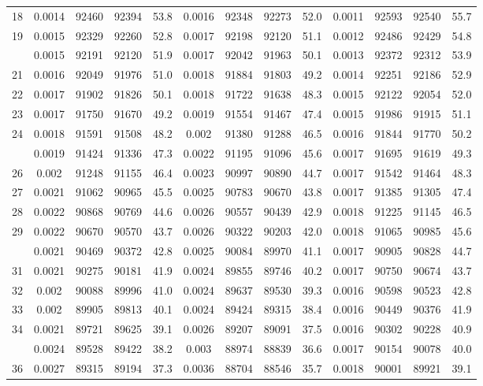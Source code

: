 \documentclass[
  14pt,
]{article}
\begin{document}
\begin{longtable}[t]{lcccccccccccc}
18 & 0.0014 & 92460 & 92394 & 53.8 & 0.0016 & 92348 & 92273 & 52.0 & 0.0011 & 92593 & 92540 & 55.7\\
19 & 0.0015 & 92329 & 92260 & 52.8 & 0.0017 & 92198 & 92120 & 51.1 & 0.0012 & 92486 & 92429 & 54.8\\
\addlinespace
20 & 0.0015 & 92191 & 92120 & 51.9 & 0.0017 & 92042 & 91963 & 50.1 & 0.0013 & 92372 & 92312 & 53.9\\
21 & 0.0016 & 92049 & 91976 & 51.0 & 0.0018 & 91884 & 91803 & 49.2 & 0.0014 & 92251 & 92186 & 52.9\\
22 & 0.0017 & 91902 & 91826 & 50.1 & 0.0018 & 91722 & 91638 & 48.3 & 0.0015 & 92122 & 92054 & 52.0\\
23 & 0.0017 & 91750 & 91670 & 49.2 & 0.0019 & 91554 & 91467 & 47.4 & 0.0015 & 91986 & 91915 & 51.1\\
24 & 0.0018 & 91591 & 91508 & 48.2 & 0.002 & 91380 & 91288 & 46.5 & 0.0016 & 91844 & 91770 & 50.2\\
\addlinespace
25 & 0.0019 & 91424 & 91336 & 47.3 & 0.0022 & 91195 & 91096 & 45.6 & 0.0017 & 91695 & 91619 & 49.3\\
26 & 0.002 & 91248 & 91155 & 46.4 & 0.0023 & 90997 & 90890 & 44.7 & 0.0017 & 91542 & 91464 & 48.3\\
27 & 0.0021 & 91062 & 90965 & 45.5 & 0.0025 & 90783 & 90670 & 43.8 & 0.0017 & 91385 & 91305 & 47.4\\
28 & 0.0022 & 90868 & 90769 & 44.6 & 0.0026 & 90557 & 90439 & 42.9 & 0.0018 & 91225 & 91145 & 46.5\\
29 & 0.0022 & 90670 & 90570 & 43.7 & 0.0026 & 90322 & 90203 & 42.0 & 0.0018 & 91065 & 90985 & 45.6\\
\addlinespace
30 & 0.0021 & 90469 & 90372 & 42.8 & 0.0025 & 90084 & 89970 & 41.1 & 0.0017 & 90905 & 90828 & 44.7\\
31 & 0.0021 & 90275 & 90181 & 41.9 & 0.0024 & 89855 & 89746 & 40.2 & 0.0017 & 90750 & 90674 & 43.7\\
32 & 0.002 & 90088 & 89996 & 41.0 & 0.0024 & 89637 & 89530 & 39.3 & 0.0016 & 90598 & 90523 & 42.8\\
33 & 0.002 & 89905 & 89813 & 40.1 & 0.0024 & 89424 & 89315 & 38.4 & 0.0016 & 90449 & 90376 & 41.9\\
34 & 0.0021 & 89721 & 89625 & 39.1 & 0.0026 & 89207 & 89091 & 37.5 & 0.0016 & 90302 & 90228 & 40.9\\
\addlinespace
35 & 0.0024 & 89528 & 89422 & 38.2 & 0.003 & 88974 & 88839 & 36.6 & 0.0017 & 90154 & 90078 & 40.0\\
36 & 0.0027 & 89315 & 89194 & 37.3 & 0.0036 & 88704 & 88546 & 35.7 & 0.0018 & 90001 & 89921 & 39.1\\

\end{longtable}
\end{document}
